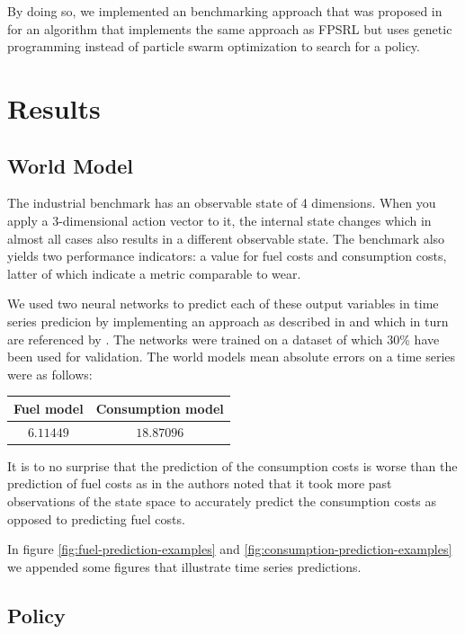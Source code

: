 \documentclass[runningheads]{llncs}
\begin{document}
    By doing so, we implemented an benchmarking approach that was proposed in \cite{Hein2018} for an algorithm that implements the same approach as FPSRL but uses genetic programming instead of particle swarm optimization to search for a policy.

    \section{Results}

    \subsection{World Model}

    The industrial benchmark has an observable state of 4 dimensions.
    When you apply a 3-dimensional action vector to it, the internal state changes which in almost all cases also results in a different observable state.
    The benchmark also yields two performance indicators: a value for fuel costs and consumption costs, latter of which indicate a metric comparable to wear.

    We used two neural networks to predict each of these output variables in time series predicion by implementing an approach as described in \cite{Duell2012} and \cite{Hein2017b} which in turn are referenced by \cite{Hein2017a}.
    The networks were trained on a dataset of which 30\% have been used for validation.
    The world models mean absolute errors on a time series were as follows:

    \begin{center}
        \begin{tabular}{c c}
            Fuel model & Consumption model \\ \hline
            $ 6.11449 $ & $ 18.87096 $
        \end{tabular}
    \end{center}

    It is to no surprise that the prediction of the consumption costs is worse than the prediction of fuel costs as in \cite{Hein2017b} the authors noted that it took more past observations of the state space to accurately predict the consumption costs as opposed to predicting fuel costs.

    In figure \ref{fig:fuel-prediction-examples} and \ref{fig:consumption-prediction-examples} we appended some figures that illustrate time series predictions.

    \subsection{Policy}
\end{document}
